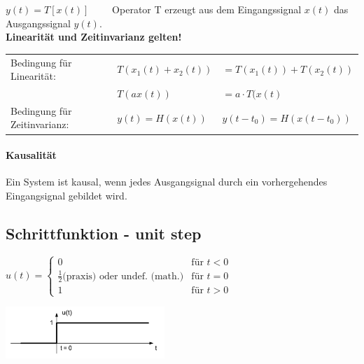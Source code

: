 \begin{center}
	
\end{center}

$ y(t) = T [ x(t)] \qquad $ Operator T erzeugt aus dem Eingangssignal $ x(t) $ das Ausgangssignal $ y(t)$. \\
\textbf{Linearität und Zeitinvarianz gelten!}\\
\begin{tabular}{lll}
	Bedingung für Linearität: & $T(x_1(t)+x_2(t))$ & $= T(x_1(t)) + T(x_2(t))$ \\
	& $T(ax(t))$ & $= a\cdot T(x(t)$\\
	Bedingung für Zeitinvarianz: & $y(t) = H(x(t))$ & $y(t-t_0) = H(x(t-t_0))$ \\
\end{tabular}

\paragraph{Kausalität} Ein System ist kausal, wenn jedes Ausgangsignal durch ein vorhergehendes Eingangsignal gebildet wird.
\\

\subsection{Schrittfunktion - unit step}
\begin{minipage}{10cm}
	$u(t) =	\begin{cases}
	  		 0 & \text{für } t < 0 \\
	  		 \frac{1}{2} \text{(praxis)}  \text{ oder undef. (math.)} & \text{für } t = 0 \\
	  		 1 & \text{für } t > 0
	  	\end{cases}
	$
\end{minipage}
\begin{minipage}{8cm}
	\includegraphics[width=6cm]{bilder/unitstep.png}
\end{minipage}


